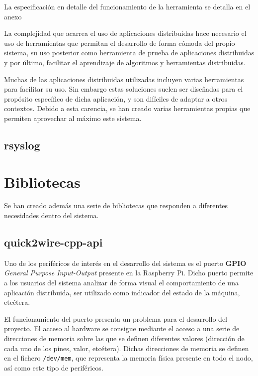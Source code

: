 La especificación en detalle del funcionamiento de la herramienta se detalla en el anexo%






La complejidad que acarrea el uso de aplicaciones distribuidas hace necesario el uso de herramientas que permitan el desarrollo de forma cómoda del propio sistema, su uso posterior como herramienta de prueba de aplicaciones distribuidas y por último, facilitar el aprendizaje de algoritmos y herramientas distribuidas.

Muchas de las aplicaciones distribuidas utilizadas incluyen varias herramientas para facilitar su uso. Sin embargo estas soluciones suelen ser diseñadas para el propósito específico de dicha aplicación, y son difíciles de adaptar a otros contextos. Debido a esta carencia, se han creado varias herramientas propias que permiten aprovechar al máximo este sistema.


\subsection{rsyslog}

\section{Bibliotecas}

Se han creado además una serie de bibliotecas que responden a diferentes necesidades dentro del sistema.

\subsection{quick2wire-cpp-api}

Uno de los periféricos de interés en el desarrollo del sistema es el puerto \textbf{GPIO} \textit{General Purpose Input-Output} presente en la Raspberry Pi. Dicho puerto permite a los usuarios del sistema analizar de forma visual el comportamiento de una aplicación distribuida, ser utilizado como indicador del estado de la máquina, etcétera.

El funcionamiento del puerto presenta un problema para el desarrollo del proyecto. El acceso al hardware se consigue mediante el acceso a una serie de direcciones de memoria sobre las que se definen diferentes valores (dirección de cada uno de los pines, valor, etcétera). Dichas direcciones de memoria se definen en el fichero \texttt{/dev/mem}, que representa la memoria física presente en todo el nodo, así como este tipo de periféricos.

